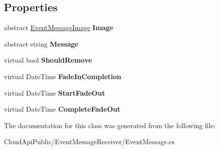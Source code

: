 \subsection*{Properties}
\begin{DoxyCompactItemize}
\item 
\hypertarget{class_cloud_api_public_1_1_event_message_receiver_1_1_event_message_ae311975104cd5249a24249e0e0402468}{abstract \hyperlink{namespace_cloud_api_public_1_1_static_aefcc1e7e1c81366ec3f6affd41c1f817}{Event\-Message\-Image} {\bfseries Image}}\label{class_cloud_api_public_1_1_event_message_receiver_1_1_event_message_ae311975104cd5249a24249e0e0402468}

\item 
\hypertarget{class_cloud_api_public_1_1_event_message_receiver_1_1_event_message_aa8c28f604d0a2e01a0cc9bdc80db673a}{abstract string {\bfseries Message}}\label{class_cloud_api_public_1_1_event_message_receiver_1_1_event_message_aa8c28f604d0a2e01a0cc9bdc80db673a}

\item 
\hypertarget{class_cloud_api_public_1_1_event_message_receiver_1_1_event_message_ad503f60a30c8e0da86f63a71b6d2ab7f}{virtual bool {\bfseries Should\-Remove}}\label{class_cloud_api_public_1_1_event_message_receiver_1_1_event_message_ad503f60a30c8e0da86f63a71b6d2ab7f}

\item 
\hypertarget{class_cloud_api_public_1_1_event_message_receiver_1_1_event_message_a3551e0ab903567a116bade7bddc39dba}{virtual Date\-Time {\bfseries Fade\-In\-Completion}}\label{class_cloud_api_public_1_1_event_message_receiver_1_1_event_message_a3551e0ab903567a116bade7bddc39dba}

\item 
\hypertarget{class_cloud_api_public_1_1_event_message_receiver_1_1_event_message_afb6242e820c6586fb774586414b00597}{virtual Date\-Time {\bfseries Start\-Fade\-Out}}\label{class_cloud_api_public_1_1_event_message_receiver_1_1_event_message_afb6242e820c6586fb774586414b00597}

\item 
\hypertarget{class_cloud_api_public_1_1_event_message_receiver_1_1_event_message_ab191d62e48262b0d826075383c92a98c}{virtual Date\-Time {\bfseries Complete\-Fade\-Out}}\label{class_cloud_api_public_1_1_event_message_receiver_1_1_event_message_ab191d62e48262b0d826075383c92a98c}

\end{DoxyCompactItemize}


The documentation for this class was generated from the following file\-:\begin{DoxyCompactItemize}
\item 
Cloud\-Api\-Public/\-Event\-Message\-Receiver/Event\-Message.\-cs\end{DoxyCompactItemize}
